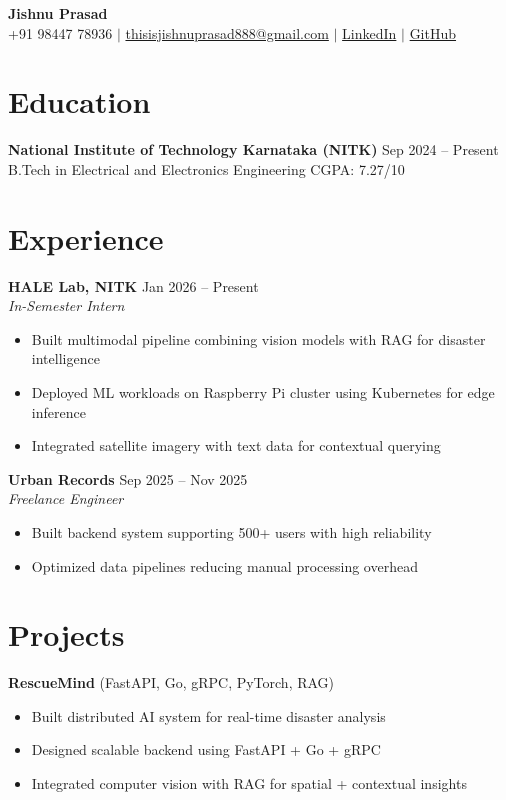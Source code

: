 \documentclass[letterpaper,11pt]{article}
\begin{document}
\begin{center}
\textbf{\Huge Jishnu Prasad} \\
+91 98447 78936 $|$ \href{mailto:thisisjishnuprasad888@gmail.com}{thisisjishnuprasad888@gmail.com} $|$
\href{https://linkedin.com/in/jishnu-prasad-ba90a9328}{LinkedIn} $|$
\href{https://github.com/Jishnu-Prasad888}{GitHub}
\end{center}

\section{Education}
\textbf{National Institute of Technology Karnataka (NITK)} \hfill Sep 2024 -- Present \\
B.Tech in Electrical and Electronics Engineering \hfill CGPA: 7.27/10

\section{Experience}
\textbf{HALE Lab, NITK} \hfill Jan 2026 -- Present \\
\textit{In-Semester Intern}
\begin{itemize}[noitemsep]
\item Built multimodal pipeline combining vision models with RAG for disaster intelligence
\item Deployed ML workloads on Raspberry Pi cluster using Kubernetes for edge inference
\item Integrated satellite imagery with text data for contextual querying
\end{itemize}

\textbf{Urban Records} \hfill Sep 2025 -- Nov 2025 \\
\textit{Freelance Engineer}
\begin{itemize}[noitemsep]
\item Built backend system supporting 500+ users with high reliability
\item Optimized data pipelines reducing manual processing overhead
\end{itemize}

\section{Projects}
\textbf{RescueMind} (FastAPI, Go, gRPC, PyTorch, RAG)
\begin{itemize}[noitemsep]
\item Built distributed AI system for real-time disaster analysis
\item Designed scalable backend using FastAPI + Go + gRPC
\item Integrated computer vision with RAG for spatial + contextual insights
\end{itemize}
\end{document}
